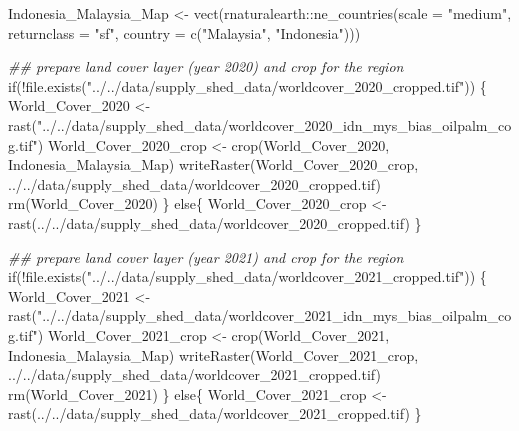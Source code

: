 \documentclass[
  letterpaper,
  DIV=11,
  numbers=noendperiod]{scrartcl}
\newenvironment{Shaded}{\begin{snugshade}}{\end{snugshade}}
\newcommand{\AttributeTok}[1]{\textcolor[rgb]{0.40,0.45,0.13}{#1}}
\newcommand{\ControlFlowTok}[1]{\textcolor[rgb]{0.00,0.23,0.31}{#1}}
\newcommand{\DocumentationTok}[1]{\textcolor[rgb]{0.37,0.37,0.37}{\textit{#1}}}
\newcommand{\FunctionTok}[1]{\textcolor[rgb]{0.28,0.35,0.67}{#1}}
\newcommand{\NormalTok}[1]{\textcolor[rgb]{0.00,0.23,0.31}{#1}}
\newcommand{\OtherTok}[1]{\textcolor[rgb]{0.00,0.23,0.31}{#1}}
\newcommand{\SpecialCharTok}[1]{\textcolor[rgb]{0.37,0.37,0.37}{#1}}
\newcommand{\StringTok}[1]{\textcolor[rgb]{0.13,0.47,0.30}{#1}}
\begin{document}
\begin{Shaded}
\begin{Highlighting}[]
\NormalTok{Indonesia\_Malaysia\_Map }\OtherTok{\textless{}{-}} \FunctionTok{vect}\NormalTok{(rnaturalearth}\SpecialCharTok{::}\FunctionTok{ne\_countries}\NormalTok{(}\AttributeTok{scale =} \StringTok{"medium"}\NormalTok{, }
                                                      \AttributeTok{returnclass =} \StringTok{"sf"}\NormalTok{,}
                                                      \AttributeTok{country =} \FunctionTok{c}\NormalTok{(}\StringTok{"Malaysia"}\NormalTok{, }\StringTok{"Indonesia"}\NormalTok{)))}

\DocumentationTok{\#\# prepare land cover layer (year 2020) and crop for the region}
\ControlFlowTok{if}\NormalTok{(}\SpecialCharTok{!}\FunctionTok{file.exists}\NormalTok{(}\StringTok{"../../data/supply\_shed\_data/worldcover\_2020\_cropped.tif"}\NormalTok{)) \{}
\NormalTok{  World\_Cover\_2020 }\OtherTok{\textless{}{-}}
    \FunctionTok{rast}\NormalTok{(}\StringTok{"../../data/supply\_shed\_data/worldcover\_2020\_idn\_mys\_bias\_oilpalm\_cog.tif"}\NormalTok{)}
\NormalTok{  World\_Cover\_2020\_crop }\OtherTok{\textless{}{-}}
    \FunctionTok{crop}\NormalTok{(World\_Cover\_2020, Indonesia\_Malaysia\_Map)}
  \FunctionTok{writeRaster}\NormalTok{(World\_Cover\_2020\_crop,}
              \StringTok{\textquotesingle{}../../data/supply\_shed\_data/worldcover\_2020\_cropped.tif\textquotesingle{}}\NormalTok{)}
  \FunctionTok{rm}\NormalTok{(World\_Cover\_2020)}
\NormalTok{\} }\ControlFlowTok{else}\NormalTok{\{}
\NormalTok{  World\_Cover\_2020\_crop }\OtherTok{\textless{}{-}}
    \FunctionTok{rast}\NormalTok{(}\StringTok{\textquotesingle{}../../data/supply\_shed\_data/worldcover\_2020\_cropped.tif\textquotesingle{}}\NormalTok{)}
\NormalTok{\}}

\DocumentationTok{\#\# prepare land cover layer (year 2021) and crop for the region}
\ControlFlowTok{if}\NormalTok{(}\SpecialCharTok{!}\FunctionTok{file.exists}\NormalTok{(}\StringTok{"../../data/supply\_shed\_data/worldcover\_2021\_cropped.tif"}\NormalTok{)) \{}
\NormalTok{  World\_Cover\_2021 }\OtherTok{\textless{}{-}}
    \FunctionTok{rast}\NormalTok{(}\StringTok{"../../data/supply\_shed\_data/worldcover\_2021\_idn\_mys\_bias\_oilpalm\_cog.tif"}\NormalTok{)}
\NormalTok{  World\_Cover\_2021\_crop }\OtherTok{\textless{}{-}}
    \FunctionTok{crop}\NormalTok{(World\_Cover\_2021, Indonesia\_Malaysia\_Map)}
  \FunctionTok{writeRaster}\NormalTok{(World\_Cover\_2021\_crop,}
              \StringTok{\textquotesingle{}../../data/supply\_shed\_data/worldcover\_2021\_cropped.tif\textquotesingle{}}\NormalTok{)}
  \FunctionTok{rm}\NormalTok{(World\_Cover\_2021)}
\NormalTok{\} }\ControlFlowTok{else}\NormalTok{\{}
\NormalTok{  World\_Cover\_2021\_crop }\OtherTok{\textless{}{-}}
    \FunctionTok{rast}\NormalTok{(}\StringTok{\textquotesingle{}../../data/supply\_shed\_data/worldcover\_2021\_cropped.tif\textquotesingle{}}\NormalTok{)}
\NormalTok{\}}


\end{Highlighting}
\end{Shaded}
\end{document}
